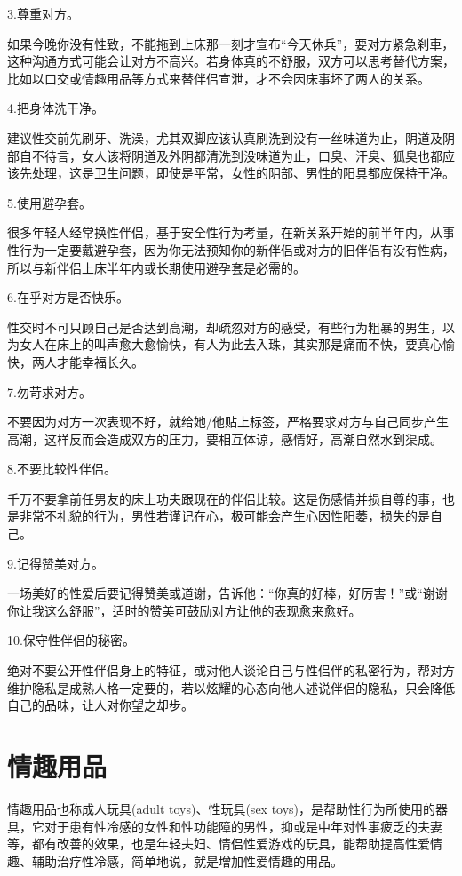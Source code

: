 \documentclass[12pt,UTF8]{ctexbook}
\begin{document}
3.尊重对方。

如果今晚你没有性致，不能拖到上床那一刻才宣布“今天休兵”，要对方紧急刹車，这种沟通方式可能会让对方不高兴。若身体真的不舒服，双方可以思考替代方案，比如以口交或情趣用品等方式来替伴侣宣泄，才不会因床事坏了两人的关系。

4.把身体洗干净。

建议性交前先刷牙、洗澡，尤其双脚应该认真刷洗到没有一丝味道为止，阴道及阴部自不待言，女人该将阴道及外阴都清洗到没味道为止，口臭、汗臭、狐臭也都应该先处理，这是卫生问题，即使是平常，女性的阴部、男性的阳具都应保持干净。

5.使用避孕套。

很多年轻人经常换性伴侣，基于安全性行为考量，在新关系开始的前半年内，从事性行为一定要戴避孕套，因为你无法预知你的新伴侣或对方的旧伴侣有没有性病，所以与新伴侣上床半年内或长期使用避孕套是必需的。

6.在乎对方是否快乐。

性交时不可只顾自己是否达到高潮，却疏忽对方的感受，有些行为粗暴的男生，以为女人在床上的叫声愈大愈愉快，有人为此去入珠，其实那是痛而不快，要真心愉快，两人才能幸福长久。

7.勿苛求对方。

不要因为对方一次表现不好，就给她/他贴上标签，严格要求对方与自己同步产生高潮，这样反而会造成双方的压力，要相互体谅，感情好，高潮自然水到渠成。

8.不要比较性伴侣。

千万不要拿前任男友的床上功夫跟现在的伴侣比较。这是伤感情并损自尊的事，也是非常不礼貌的行为，男性若谨记在心，极可能会产生心因性阳萎，损失的是自己。

9.记得赞美对方。

一场美好的性爱后要记得赞美或道谢，告诉他：“你真的好棒，好厉害！”或“谢谢你让我这么舒服”，适时的赞美可鼓励对方让他的表现愈来愈好。

10.保守性伴侣的秘密。

绝对不要公开性伴侣身上的特征，或对他人谈论自己与性侣伴的私密行为，帮对方维护隐私是成熟人格一定要的，若以炫耀的心态向他人述说伴侣的隐私，只会降低自己的品味，让人对你望之却步。

\chapter{情趣用品}

情趣用品也称成人玩具(adult toys)、性玩具(sex toys)，是帮助性行为所使用的器具，它对于患有性冷感的女性和性功能障的男性，抑或是中年对性事疲乏的夫妻等，都有改善的效果，也是年轻夫妇、情侣性爱游戏的玩具，能帮助提高性爱情趣、辅助治疗性冷感，简单地说，就是增加性爱情趣的用品。
\end{document}
